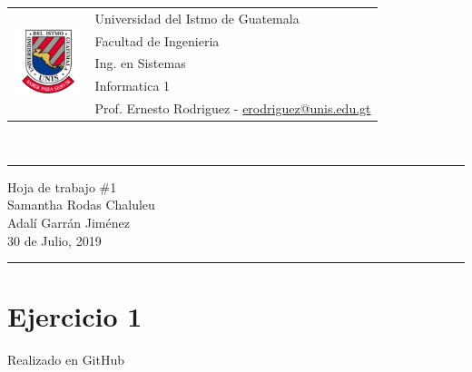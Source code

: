 \documentclass{article}
\newcommand{\horrule}[1]{\rule{\linewidth}{#1}}
\begin{document}
\begin{tabular}{l l}
\multirow{5}{*}{\includegraphics[width=2cm]{escudo.png}} & Universidad del Istmo de Guatemala \\
 & Facultad de Ingenieria \\
 & Ing. en Sistemas \\
 & Informatica 1 \\
 & Prof. Ernesto Rodriguez - \href{mailto:erodriguez@unis.edu.gt}{erodriguez@unis.edu.gt} \\
\end{tabular}
\\

\begin{center}
        \horrule{0.5pt}
        \huge{Hoja de trabajo \#1} \\
        \large{Samantha Rodas Chaluleu}\\
        \large{Adalí Garrán Jiménez}\\
        \large{30 de Julio, 2019} \\
        \horrule{1pt}
\end{center}

\section*{Ejercicio 1}
Realizado en GitHub
\end{document}
